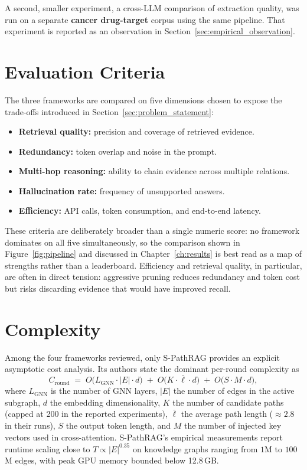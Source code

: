 \documentclass[12pt,a4paper,oneside]{report}
\begin{document}
A second, smaller experiment, a cross-LLM comparison of extraction
quality, was run on a separate \textbf{cancer drug-target} corpus
using the same pipeline. That experiment is reported as an observation
in Section~\ref{sec:empirical_observation}.

\section{Evaluation Criteria}

The three frameworks are compared on five dimensions chosen to expose
the trade-offs introduced in Section~\ref{sec:problem_statement}:
\begin{itemize}[leftmargin=2em,itemsep=2pt]
    \item \textbf{Retrieval quality:} precision and coverage of retrieved
          evidence.
    \item \textbf{Redundancy:} token overlap and noise in the prompt.
    \item \textbf{Multi-hop reasoning:} ability to chain evidence across
          multiple relations.
    \item \textbf{Hallucination rate:} frequency of unsupported answers.
    \item \textbf{Efficiency:} API calls, token consumption, and end-to-end
          latency.
\end{itemize}

These criteria are deliberately broader than a single numeric score:
no framework dominates on all five simultaneously, so the comparison
shown in Figure~\ref{fig:pipeline} and discussed in
Chapter~\ref{ch:results} is best read as a map of strengths rather
than a leaderboard. Efficiency and retrieval quality, in particular,
are often in direct tension: aggressive pruning reduces redundancy and
token cost but risks discarding evidence that would have improved
recall.

\section{Complexity}
\label{sec:complexity}

Among the four frameworks reviewed, only S-PathRAG provides an
explicit asymptotic cost analysis. Its authors state the dominant
per-round complexity as \citep{fu2026spathrag}
\begin{equation}
    C_{\mathrm{round}} \;=\; O\!\bigl(L_{\mathrm{GNN}} \cdot |E| \cdot d\bigr)
                            \;+\; O\!\bigl(K \cdot \bar{\ell} \cdot d\bigr)
                            \;+\; O\!\bigl(S \cdot M \cdot d\bigr),
    \label{eq:spathrag_complexity}
\end{equation}
where $L_{\mathrm{GNN}}$ is the number of GNN layers, $|E|$ the
number of edges in the active subgraph, $d$ the embedding
dimensionality, $K$ the number of candidate paths (capped at 200 in
the reported experiments), $\bar{\ell}$ the average path length
($\approx 2.8$ in their runs), $S$ the output token length, and $M$
the number of injected key vectors used in cross-attention.
S-PathRAG's empirical measurements report runtime scaling close to
$T \propto |E|^{0.35}$ on knowledge graphs ranging from $1$M to
$100$M edges, with peak GPU memory bounded below 12.8\,GB.
\end{document}
